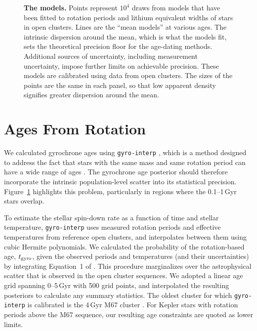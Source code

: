 \documentclass[11pt,twocolumn,tighten,linenumbers]{aastex63}
\begin{document}
\begin{figure}[!t]
	\begin{center}
		\leavevmode
	\end{center}
	\vspace{-0.6cm}
  \caption{{\bf The models.}
    Points represent $10^4$ draws from models that have been fitted to
    rotation periods \citep{Bouma_2023} and lithium equivalent widths
    \citep[EWs;][]{Jeffries_2023} of stars in open clusters.  Lines
    are the ``mean models'' at various ages.  The intrinsic dispersion
    around the mean, which is what the models fit, sets the
    theoretical precision floor for the age-dating methods.
    Additional sources of uncertainty, including measurement
    uncertainty, impose further limits on achievable precision.  These
    models are calibrated using data from open clusters.  The sizes of
    the points are the same in each panel, so that low apparent
    density signifies greater dispersion around the mean.
		\label{fig:models}
	}
\end{figure}


\section{Ages From Rotation}
\label{sec:rotage}

We calculated gyrochrone ages using \texttt{gyro-interp}
\citep{Bouma_2023}, which is a method designed to address the fact
that stars with the same mass and same rotation period can have a wide
range of ages \citep[e.g.][]{Curtis_2019_ngc6811}.  The gyrochrone age
posterior should therefore incorporate the intrinsic population-level
scatter into its statistical precision.  Figure~\ref{fig:models}
highlights this problem, particularly in regions where the 0.1--1\,Gyr
stars overlap.

To estimate the stellar spin-down rate as a function of time and
stellar temperature, \texttt{gyro-interp} uses measured rotation
periods and effective temperatures from reference open clusters, and
interpolates between them using cubic Hermite polynomials.  We
calculated the probability of the rotation-based age, $t_{\rm gyro}$,
given the observed periods and temperatures (and their uncertainties)
by integrating Equation~1 of \citet{Bouma_2023}.  This procedure
marginalizes over the astrophysical scatter that is observed in the
open cluster sequences.  We adopted a linear age grid spanning
0--5\,Gyr with 500 grid points, and interpolated the resulting
posteriors to calculate any summary statistics.  The oldest cluster
for which \texttt{gyro-interp} is calibrated is the 4\,Gyr M67 cluster
\citep[][]{Dungee_2022,Gruner_2023}.  For Kepler stars with rotation
periods above the M67 sequence, our resulting age constraints are
quoted as lower limits.
\end{document}
